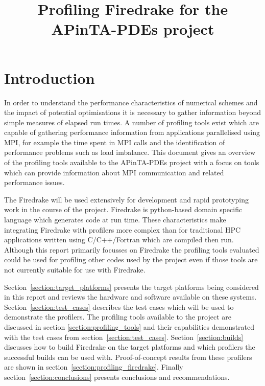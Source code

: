 \documentclass[a4paper,titlepage]{article}
\author{}
\date{}
\title{Profiling Firedrake for the APinTA-PDEs project}
\begin{document}
\pagestyle{fancy}
\lhead{}
\chead{}

\maketitle
\pagebreak
\tableofcontents
\pagebreak


\section{Introduction}

In order to understand the performance characteristics of numerical schemes and the impact of potential optimisations it is necessary to gather information beyond simple measures of elapsed run times. A number of profiling tools exist which are capable of gathering performance information from applications parallelised using MPI, for example the time spent in MPI calls and the identification of performance problems such as load imbalance. This document gives an overview of the profiling tools available to the APinTA-PDEs project with a focus on tools which can provide information about MPI communication and related performance issues. 

The Firedrake will be used extensively for development and rapid prototyping work in the course of the project. Firedrake is python-based domain specific language which generates code at run time. These characteristics make integrating Firedrake with profilers more complex than for traditional HPC applications written using C/C++/Fortran which are compiled then run. Although this report primarily focusses on Firedrake the profiling tools evaluated could be used for profiling other codes used by the project even if those tools are not currently suitable for use with Firedrake.

Section~\ref{section:target_platforms} presents the target platforms being considered in this report and reviews the hardware and software available on these systems. Section~\ref{section:test_cases} describes the test cases which will be used to demonstrate the profilers. The profiling tools available to the project are discussed in section \ref{section:profiling_tools} and their capabilities demonstrated with the test cases from section~\ref{section:test_cases}. Section~\ref{section:builds} discusses how to build Firedrake on the target platforms and which profilers the successful builds can be used with. Proof-of-concept results from these profilers are shown in section~\ref{section:profiling_firedrake}. Finally section~\ref{section:conclusions} presents conclusions and recommendations. 
\end{document}
